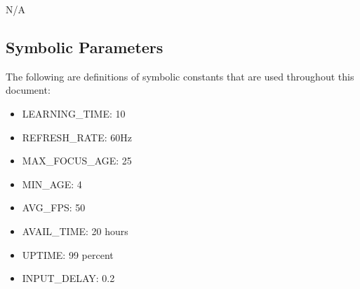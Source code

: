 \documentclass[12pt, titlepage]{article}
\begin{document}
N/A

\subsection{Symbolic Parameters}

The following are definitions of symbolic constants that are used throughout this document:

\begin{itemize}
    \item LEARNING\_TIME: 10
    \item REFRESH\_RATE: 60Hz
    \item MAX\_FOCUS\_AGE: 25
    \item MIN\_AGE: 4
    \item AVG\_FPS: 50
    \item AVAIL\_TIME: 20 hours
    \item UPTIME: 99 percent
    \item INPUT\_DELAY: 0.2
    
\end{itemize}
\end{document}
